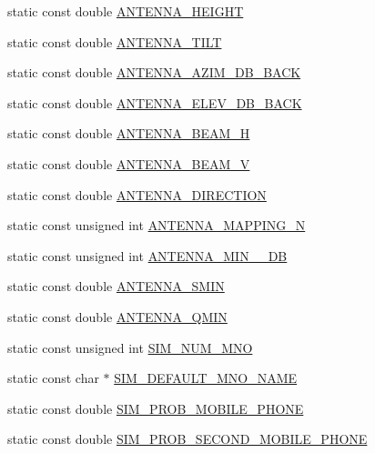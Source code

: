 \begin{DoxyCompactItemize}
\item 
static const double \hyperlink{class_constants_adfe27efa61ae50b73c74b3f19c292625}{A\+N\+T\+E\+N\+N\+A\+\_\+\+H\+E\+I\+G\+HT}
\item 
static const double \hyperlink{class_constants_ad92a5c99071f0d843ee555e74c5f909a}{A\+N\+T\+E\+N\+N\+A\+\_\+\+T\+I\+LT}
\item 
static const double \hyperlink{class_constants_aa2030f2c0ec89fb7cc06b31bbb50793d}{A\+N\+T\+E\+N\+N\+A\+\_\+\+A\+Z\+I\+M\+\_\+\+D\+B\+\_\+\+B\+A\+CK}
\item 
static const double \hyperlink{class_constants_a8efdd6e1f2a25c24cb6dbff363e2d61a}{A\+N\+T\+E\+N\+N\+A\+\_\+\+E\+L\+E\+V\+\_\+\+D\+B\+\_\+\+B\+A\+CK}
\item 
static const double \hyperlink{class_constants_a4e4a0a48ad06c458ae4f3e6d0e4e6608}{A\+N\+T\+E\+N\+N\+A\+\_\+\+B\+E\+A\+M\+\_\+H}
\item 
static const double \hyperlink{class_constants_a2389355f6184d3b7903e154b46d069f5}{A\+N\+T\+E\+N\+N\+A\+\_\+\+B\+E\+A\+M\+\_\+V}
\item 
static const double \hyperlink{class_constants_ad82a10e13ae9e1cbce1cef616e47df31}{A\+N\+T\+E\+N\+N\+A\+\_\+\+D\+I\+R\+E\+C\+T\+I\+ON}
\item 
static const unsigned int \hyperlink{class_constants_a5db3a5bad9c514c994e71063dee2a798}{A\+N\+T\+E\+N\+N\+A\+\_\+\+M\+A\+P\+P\+I\+N\+G\+\_\+N}
\item 
static const unsigned int \hyperlink{class_constants_a2bda61c04e204f4a1279338fb790e1f4}{A\+N\+T\+E\+N\+N\+A\+\_\+\+M\+I\+N\+\_\+\_\+\+DB}
\item 
static const double \hyperlink{class_constants_af58b693e1ab4cdb1e83399eb0f2af647}{A\+N\+T\+E\+N\+N\+A\+\_\+\+S\+M\+IN}
\item 
static const double \hyperlink{class_constants_a9149aaac071422191e4417885fd42b07}{A\+N\+T\+E\+N\+N\+A\+\_\+\+Q\+M\+IN}
\item 
static const unsigned int \hyperlink{class_constants_a763bdd9401295d6b691c93cf580e562a}{S\+I\+M\+\_\+\+N\+U\+M\+\_\+\+M\+NO}
\item 
static const char $\ast$ \hyperlink{class_constants_a186cf83e20074a889823a7f36e50ad8c}{S\+I\+M\+\_\+\+D\+E\+F\+A\+U\+L\+T\+\_\+\+M\+N\+O\+\_\+\+N\+A\+ME}
\item 
static const double \hyperlink{class_constants_a8af75c6e731c2f425cce792b33786db7}{S\+I\+M\+\_\+\+P\+R\+O\+B\+\_\+\+M\+O\+B\+I\+L\+E\+\_\+\+P\+H\+O\+NE}
\item 
static const double \hyperlink{class_constants_aafd39df52173dca1074d8c92aa5f9649}{S\+I\+M\+\_\+\+P\+R\+O\+B\+\_\+\+S\+E\+C\+O\+N\+D\+\_\+\+M\+O\+B\+I\+L\+E\+\_\+\+P\+H\+O\+NE}

\end{DoxyCompactItemize}
